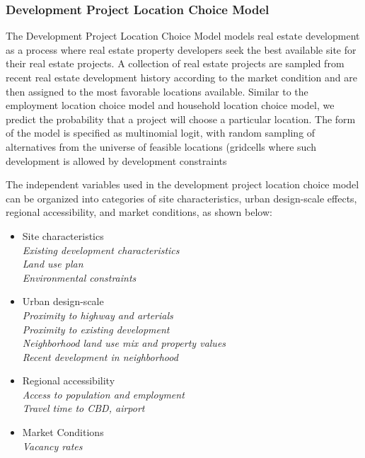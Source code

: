 \subsubsection{Development Project Location Choice Model}
%
\label{real-estate-development-model-gridcell}
%
The Development Project Location Choice Model models real
estate development as a process where real estate property
developers seek the best available site for their real
estate projects.  A collection of real estate projects are
sampled from recent real estate development history
according to the market condition and are then assigned to
the most favorable locations available.  Similar to the
employment location choice model and household location
choice model, we predict the probability that a project will
choose a particular location.  The form of the
model is specified as multinomial logit, with random
sampling of alternatives from the universe of feasible
locations (gridcells where such development is allowed by
development constraints

The independent variables used in the development project
location choice model can be organized into categories of
site characteristics, urban design-scale effects, regional
accessibility, and market conditions, as shown below:

\begin{itemize}
\item Site characteristics \\
\emph{Existing development characteristics \\
Land use plan \\
Environmental constraints}

\item Urban design-scale \\
\emph{Proximity to highway and arterials \\
Proximity to existing development \\
Neighborhood land use mix and property values \\
Recent development in neighborhood}

\item Regional accessibility \\
\emph{Access to population and employment \\
Travel time to CBD, airport}

\item Market Conditions \\
\emph{Vacancy rates}
\end{itemize}

